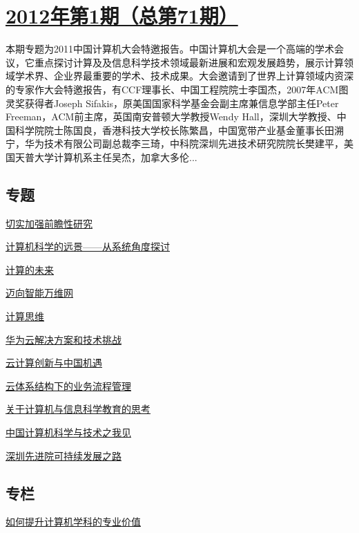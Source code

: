 \documentclass[a4paper]{article}
\begin{document}
\section{\href{http://history.ccf.org.cn/sites/ccf/jsjtbbd.jsp?contentId=2653836525553}{\textbf{2012年第1期（总第71期）}}}
本期专题为2011中国计算机大会特邀报告。中国计算机大会是一个高端的学术会议，它重点探讨计算及及信息科学技术领域最新进展和宏观发展趋势，展示计算领域学术界、企业界最重要的学术、技术成果。大会邀请到了世界上计算领域内资深的专家作大会特邀报告，有CCF理事长、中国工程院院士李国杰，2007年ACM图灵奖获得者Joseph Sifakis，原美国国家科学基金会副主席兼信息学部主任Peter Freeman，ACM前主席，英国南安普顿大学教授Wendy Hall，深圳大学教授、中国科学院院士陈国良，香港科技大学校长陈繁昌，中国宽带产业基金董事长田溯宁，华为技术有限公司副总裁李三琦，中科院深圳先进技术研究院院长樊建平，美国天普大学计算机系主任吴杰，加拿大多伦...
\subsection{专题}
\href{http://history.ccf.org.cn/resources/1190201776262/2012/01/19/1.pdf}{切实加强前瞻性研究}

\href{http://history.ccf.org.cn/resources/1190201776262/2012/01/19/2.pdf}{计算机科学的远景——从系统角度探讨}

\href{http://history.ccf.org.cn/resources/1190201776262/2012/01/19/3.pdf}{计算的未来}

\href{http://history.ccf.org.cn/resources/1190201776262/2012/01/19/4.pdf}{迈向智能万维网}

\href{http://history.ccf.org.cn/resources/1190201776262/2012/01/19/6.pdf}{计算思维}

\href{http://history.ccf.org.cn/resources/1190201776262/2012/01/19/7.pdf}{华为云解决方案和技术挑战}

\href{http://history.ccf.org.cn/resources/1190201776262/2012/01/19/9.pdf}{云计算创新与中国机遇}

\href{http://history.ccf.org.cn/resources/1190201776262/2012/01/19/11.pdf}{云体系结构下的业务流程管理}

\href{http://history.ccf.org.cn/resources/1190201776262/2012/01/19/8.pdf}{关于计算机与信息科学教育的思考}

\href{http://history.ccf.org.cn/resources/1190201776262/2012/01/19/5.pdf}{中国计算机科学与技术之我见}

\href{http://history.ccf.org.cn/resources/1190201776262/2012/01/19/10.pdf}{深圳先进院可持续发展之路}

\subsection{专栏}
\href{http://history.ccf.org.cn/resources/1190201776262/2012/01/19/14.pdf}{如何提升计算机学科的专业价值}
\end{document}
